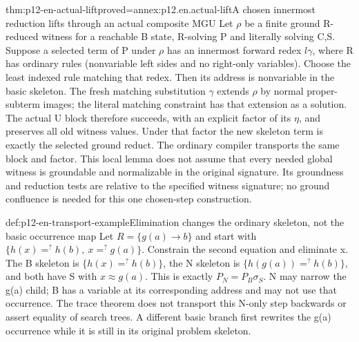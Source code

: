 \begin{hblemma}{thm:p12-en-actual-lift}{proved=annex:p12.en.actual-lift}{A chosen innermost reduction lifts through an actual composite MGU}
Let \(\rho\) be a finite ground R-reduced witness for a reachable
B state, R-solving P and literally solving C,S. Suppose a selected term of P under
\(\rho\) has an innermost forward redex \(l\gamma\), where R
has ordinary rules (nonvariable left sides and no right-only variables).
Choose the least indexed rule matching that redex. Then its address
is nonvariable in the basic skeleton. The fresh matching substitution
\(\gamma\) extends \(\rho\) by normal proper-subterm images;
the literal matching constraint has that extension as a solution.
The actual U block therefore succeeds, with an explicit factor of
its \(\eta\), and preserves all old witness values. Under that
factor the new skeleton term is exactly the selected ground reduct.
The ordinary compiler transports the same block and factor. This
local lemma does not assume that every needed global witness is
groundable and normalizable in the original signature. Its groundness
and reduction tests are relative to the specified witness signature;
no ground confluence is needed for this one chosen-step construction.
\end{hblemma}

\begin{hbexample}{def:p12-en-transport-example}{Elimination changes the ordinary skeleton, not the basic occurrence map}
Let \(R=\{g(a)\to b\}\) and start with
\(\{h(x)=^{?}h(b),\ x=^{?}g(a)\}\). Constrain the second
equation and eliminate x. The B skeleton is
\(\{h(x)=^{?}h(b)\}\), the N skeleton is
\(\{h(g(a))=^{?}h(b)\}\), and both have S with
\(x\approx g(a)\). This is exactly \(P_N=P_B\sigma_S\).
N may narrow the g(a) child; B has a variable at its corresponding
address and may not use that occurrence. The trace theorem does not
transport this N-only step backwards or assert equality of search
trees. A different basic branch first rewrites the g(a) occurrence
while it is still in its original problem skeleton.
\end{hbexample}

